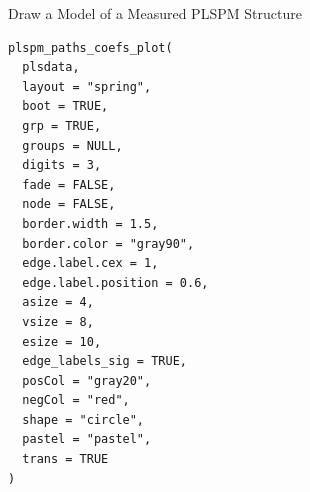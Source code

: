 \documentclass[a4paper]{book}
\begin{document}
%
\begin{Description}
Draw a Model of a Measured PLSPM Structure
\end{Description}
%
\begin{Usage}
\begin{verbatim}
plspm_paths_coefs_plot(
  plsdata,
  layout = "spring",
  boot = TRUE,
  grp = TRUE,
  groups = NULL,
  digits = 3,
  fade = FALSE,
  node = FALSE,
  border.width = 1.5,
  border.color = "gray90",
  edge.label.cex = 1,
  edge.label.position = 0.6,
  asize = 4,
  vsize = 8,
  esize = 10,
  edge_labels_sig = TRUE,
  posCol = "gray20",
  negCol = "red",
  shape = "circle",
  pastel = "pastel",
  trans = TRUE
)
\end{verbatim}
\end{Usage}
%
\end{document}
